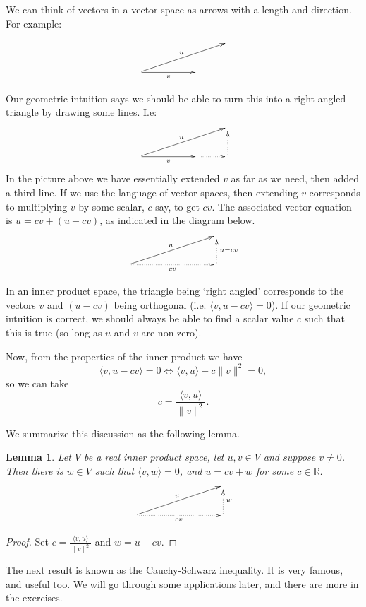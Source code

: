\documentclass{article}
\theoremstyle{plain}
\newtheorem{lemma}[theorem]{Lemma}{\bfseries}{\upshape}
\newcommand{\bR}{\mathbb{R}}
\begin{document}
We can think of vectors in a vector space as arrows with a length and direction. For example: 

\[\xymatrix{ & & & \\
\ar[rrru]^u\ar[rr]_v & & 
}\] 

Our geometric intuition says we should be able to turn this into a right angled triangle by drawing some lines. I.e:
\[\xymatrix{ & & & \\
\ar[rrru]^u\ar[rr]_v & &\ar@{.>}[r] &\ar@{.>}[u]
}\]
In the picture above we have essentially extended $v$ as far as we need, then added a third line. If we use the language of vector spaces, then extending $v$ corresponds to multiplying $v$ by some scalar, $c$ say, to get $cv$. The associated vector equation is $u = cv + (u -cv)$, as indicated in the diagram below. 
\[\xymatrix{ & & & \\
\ar[rrru]^u\ar@{.>}[rrr]_{cv} & & &\ar@{.>}[u]_{u-cv}
}\]

In an inner product space, the triangle being `right angled' corresponds to the vectors $v$ and $(u-cv)$ being orthogonal (i.e. $\langle v, u-cv\rangle = 0$). If our geometric intuition is correct, we should always be able to find a scalar value $c$ such that this is true (so long as $u$ and $v$ are non-zero). 

Now, from the properties of the inner product we have
\[\langle v, u-cv\rangle = 0 \iff \langle v, u\rangle - c\|v\|^2 = 0,\]
so we can take 
\[c = \frac{\langle v, u \rangle}{\|v\|^2}.\]

We summarize this discussion as the following lemma.

\begin{lemma}\label{L:LA4orth}
Let $V$ be a real inner product space, let $u,v\in V$ and suppose $v\neq 0$. Then there is $w\in V$ such that $\langle v, w\rangle =0$, and $u = cv + w$ for some $c\in \bR$. 
\[\xymatrix{ & & & \\
\ar[rrru]^u\ar@{.>}[rrr]_{cv} & & &\ar@{.>}[u]_{w}
}\]
\end{lemma}
\begin{proof}
Set $c = \frac{\langle v, u \rangle}{\|v\|^2}$ and $w = u - cv$.
\end{proof}

The next result is known as the Cauchy-Schwarz inequality. It is very famous, and useful too. We will go through some applications later, and there are more in the exercises.
\end{document}
